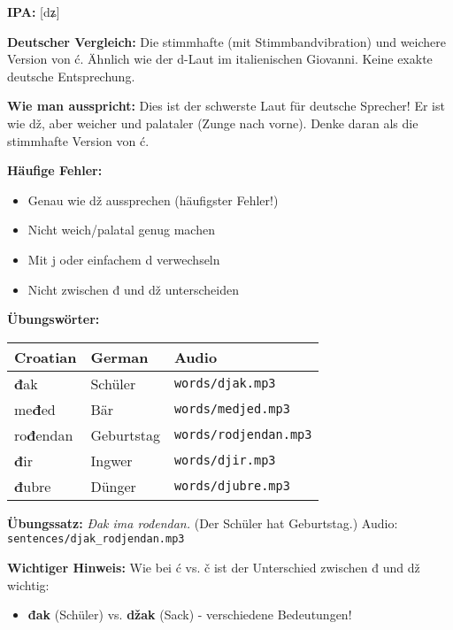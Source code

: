 \begin{tcolorbox}[colback=lightblue!30, colframe=croatianblue, title=\textbf{Đ, đ}]

\textbf{IPA:} [dʑ]

\textbf{Deutscher Vergleich:}
Die stimmhafte (mit Stimmbandvibration) und weichere Version von \glqq ć\grqq{}. Ähnlich wie der \glqq d\grqq{}-Laut im italienischen \glqq Giovanni\grqq{}. Keine exakte deutsche Entsprechung.

\textbf{Wie man ausspricht:}
Dies ist der schwerste Laut für deutsche Sprecher! Er ist wie \glqq dž\grqq{}, aber weicher und palataler (Zunge nach vorne). Denke daran als die stimmhafte Version von \glqq ć\grqq{}.

\textbf{Häufige Fehler:}
\begin{itemize}
    \item Genau wie \glqq dž\grqq{} aussprechen (häufigster Fehler!)
    \item Nicht weich/palatal genug machen
    \item Mit \glqq j\grqq{} oder einfachem \glqq d\grqq{} verwechseln
    \item Nicht zwischen \glqq đ\grqq{} und \glqq dž\grqq{} unterscheiden
\end{itemize}

\textbf{Übungswörter:}
\begin{tabular}{lll}
\textbf{Croatian} & \textbf{German} & \textbf{Audio} \\
\midrule
\textbf{đ}ak & Schüler & \texttt{words/djak.mp3} \\
me\textbf{đ}ed & Bär & \texttt{words/medjed.mp3} \\
ro\textbf{đ}endan & Geburtstag & \texttt{words/rodjendan.mp3} \\
\textbf{đ}ir & Ingwer & \texttt{words/djir.mp3} \\
\textbf{đ}ubre & Dünger & \texttt{words/djubre.mp3} \\
\end{tabular}

\textbf{Übungssatz:}
\textit{Đak ima rođendan.}
(Der Schüler hat Geburtstag.)
Audio: \texttt{sentences/djak\_rodjendan.mp3}

\textbf{Wichtiger Hinweis:}
Wie bei \glqq ć\grqq{} vs. \glqq č\grqq{} ist der Unterschied zwischen \glqq đ\grqq{} und \glqq dž\grqq{} wichtig:
\begin{itemize}
    \item \textbf{đak} (Schüler) vs. \textbf{džak} (Sack) - verschiedene Bedeutungen!
\end{itemize}

\end{tcolorbox}

